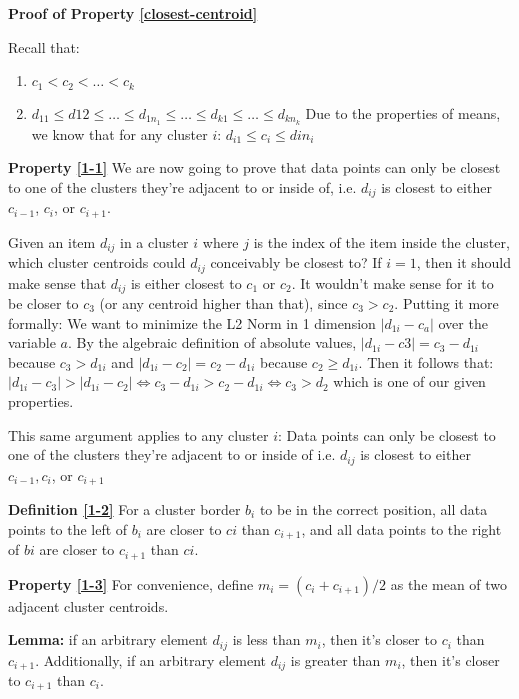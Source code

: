 \documentclass[conference,compsoc]{IEEEtran}
\begin{document}
\textbf{Proof of Property \ref{closest-centroid}}

Recall that:
\begin{enumerate}
\item $c_1 < c_2 < \dots < c_k$
\item $d_{11} \leq d12 \leq \dots \leq d_{1n_1} \leq \dots \leq d_{k1} \leq \dots \leq d_{kn_k}$
Due to the properties of means, we know that for any cluster $i$:
$d_{i1} \leq c_i \leq din_i$
\end{enumerate}

\textbf{Property \ref{1-1}}
We are now going to prove that data points can only be closest to one of the clusters they’re adjacent to or inside of,
i.e. $d_{ij}$ is closest to either $c_{i-1}$, $c_i$, or $c_{i+1}$.

Given an item $d_{ij}$ in a cluster $i$ where $j$ is the index of the item inside the cluster, which cluster centroids could $d_{ij}$ conceivably be closest to?
If $i=1$, then it should make sense that $d_{ij}$ is either closest to $c_1$ or $c_2$. It wouldn’t make sense for it to be closer to $c_3$ (or any centroid higher than that), since $c_3 > c_2$.
Putting it more formally: We want to minimize the L2 Norm in 1 dimension $|d_{1i} - c_a|$ over the variable $a$.
By the algebraic definition of absolute values, $|d_{1i}-c3| = c_3-d_{1i}$ because $c_3 > d_{1i}$ and $|d_{1i}-c_2| = c_2-d_{1i}$ because $c_2 \geq d_{1i}$.
Then it follows that:
$|d_{1i} - c_3| > |d_{1i} - c_2| \iff c_3 - d_{1i} > c_2 - d_{1i} \iff c_3 > d_2$ which is one of our given properties.

This same argument applies to any cluster $i$: Data points can only be closest to one of the clusters they’re adjacent to or inside of
i.e. $d_{ij}$ is closest to either $c_{i-1}, c_i$, or $c_{i+1}$

\textbf{Definition \ref{1-2}}
For a cluster border $b_i$ to be in the correct position, all data points to the left of $b_i$ are closer to $ci$ than $c_{i+1}$, and all data points to the right of $bi$ are closer to $c_{i+1}$ than $ci$.

\textbf{Property \ref{1-3}}
For convenience, define $m_i = (c_i+c_{i+1})/2$ as the mean of two adjacent cluster centroids.

\textbf{Lemma:}
if an arbitrary element $d_{ij}$ is less than $m_i$, then it’s closer to $c_i$ than $c_{i+1}$.
Additionally, if an arbitrary element $d_{ij}$ is greater than $m_i$, then it’s closer to $c_{i+1}$ than $c_i$.
\end{document}
